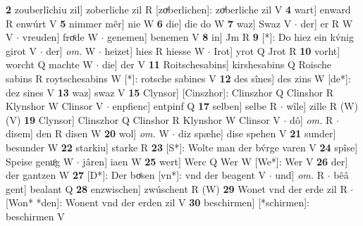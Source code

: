 \documentclass[8pt,a4paper,notitlepage]{article}
\begin{document}
\begin{table}[ht]
\begin{minipage}[t]{0.5\linewidth}
\textbf{2} zouberlîchiu zil] zoberliche zil R [zoͮberlichen]: zoͮberliche zil V \textbf{4} wart] enward R enwúrt V \textbf{5} nimmer mêr] nie W \textbf{6} die] die do W \textbf{7} waz] Swaz V  $\cdot$ der] er R W V  $\cdot$ vreuden] froͤde W  $\cdot$ genemen] benemen V \textbf{8} in] Jm R \textbf{9} [*]: Do hiez ein kv́nig girot V  $\cdot$ der] \textit{om.} W  $\cdot$ heizet] hies R hiesse W  $\cdot$ Irot] yrot Q Jrot R \textbf{10} vorht] worcht Q machte W  $\cdot$ die] der V \textbf{11} Roitschesabins] kirshesabins Q Roische sabins R roytschesabins W [*]: rotsche sabines V \textbf{12} des sînes] des zins W [de*]: dez sines V \textbf{13} waz] swaz V \textbf{15} Clynsor] [Cinszhor]: Clinszhor Q Clinshor R Klynshor W Clinsor V  $\cdot$ enpfienc] entpinf Q \textbf{17} selben] selbe R  $\cdot$ wîle] zille R (W) (V) \textbf{19} Clynsor] Clinszhor Q Clinshor R Klynshor W Clinsor V  $\cdot$ dô] \textit{om.} R  $\cdot$ disem] den R disen W \textbf{20} wol] \textit{om.} W  $\cdot$ diz spæhe] dise spehen V \textbf{21} sunder] besunder W \textbf{22} starkiu] starke R \textbf{23} [S*]: Wolte man der bv́rge varen V \textbf{24} spîse] Speise genuͦg W  $\cdot$ jâren] iaen W \textbf{25} wert] Werc Q Wer W [We*]: Wer V \textbf{26} der] der gantzen W \textbf{27} [D*]: Der boͤsen [vn*]: vnd der beagent V  $\cdot$ und] \textit{om.} R  $\cdot$ bêâ gent] bealant Q \textbf{28} enzwischen] zwúschent R (W) \textbf{29} Wonet vnd der erde zil R  $\cdot$ [Won* *den]: Wonent vnd der erden zil V \textbf{30} beschirmen] [*schirmen]: beschirmen V \newline
\end{minipage}
\end{table}
\end{document}
